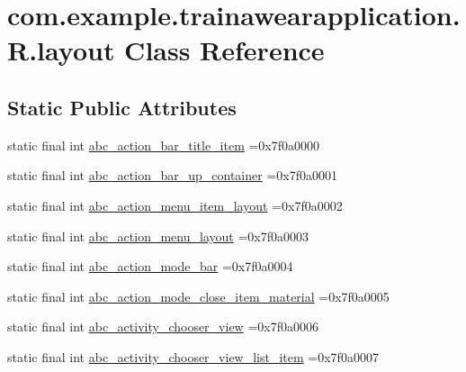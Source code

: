 \hypertarget{classcom_1_1example_1_1trainawearapplication_1_1_r_1_1layout}{}\section{com.\+example.\+trainawearapplication.\+R.\+layout Class Reference}
\label{classcom_1_1example_1_1trainawearapplication_1_1_r_1_1layout}
\subsection*{Static Public Attributes}
\begin{DoxyCompactItemize}
\item 
static final int \mbox{\hyperlink{classcom_1_1example_1_1trainawearapplication_1_1_r_1_1layout_a2e2d17438659ec80939e8cbe284b3098}{abc\+\_\+action\+\_\+bar\+\_\+title\+\_\+item}} =0x7f0a0000
\item 
static final int \mbox{\hyperlink{classcom_1_1example_1_1trainawearapplication_1_1_r_1_1layout_a8d0ba3f12b28aa21eda527986e7c46e8}{abc\+\_\+action\+\_\+bar\+\_\+up\+\_\+container}} =0x7f0a0001
\item 
static final int \mbox{\hyperlink{classcom_1_1example_1_1trainawearapplication_1_1_r_1_1layout_a93d6da718637a6447c80206513a3eb45}{abc\+\_\+action\+\_\+menu\+\_\+item\+\_\+layout}} =0x7f0a0002
\item 
static final int \mbox{\hyperlink{classcom_1_1example_1_1trainawearapplication_1_1_r_1_1layout_a776bf4675a7f57beb2f7e4470a2ab05c}{abc\+\_\+action\+\_\+menu\+\_\+layout}} =0x7f0a0003
\item 
static final int \mbox{\hyperlink{classcom_1_1example_1_1trainawearapplication_1_1_r_1_1layout_a37ed0419ec907ca27e5da68d6492f791}{abc\+\_\+action\+\_\+mode\+\_\+bar}} =0x7f0a0004
\item 
static final int \mbox{\hyperlink{classcom_1_1example_1_1trainawearapplication_1_1_r_1_1layout_a155d2aaecabea3a83f86a86dc564d43c}{abc\+\_\+action\+\_\+mode\+\_\+close\+\_\+item\+\_\+material}} =0x7f0a0005
\item 
static final int \mbox{\hyperlink{classcom_1_1example_1_1trainawearapplication_1_1_r_1_1layout_ace17fb31a60b29820d1b30df6ff0069b}{abc\+\_\+activity\+\_\+chooser\+\_\+view}} =0x7f0a0006
\item 
static final int \mbox{\hyperlink{classcom_1_1example_1_1trainawearapplication_1_1_r_1_1layout_aa421db7e3209b8162a6648465cad677a}{abc\+\_\+activity\+\_\+chooser\+\_\+view\+\_\+list\+\_\+item}} =0x7f0a0007

\end{DoxyCompactItemize}

